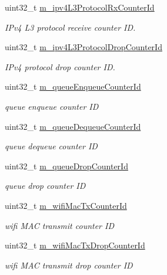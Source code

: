 \begin{DoxyCompactItemize}
uint32\+\_\+t \hyperlink{classns3_1_1AnimationInterface_a625621f7209fc0e635a2850ce24133c8}{m\+\_\+ipv4\+L3\+Protocol\+Rx\+Counter\+Id}
\begin{DoxyCompactList}\small\item\em I\+Pv4 L3 protocol receive counter ID. \end{DoxyCompactList}\item 
uint32\+\_\+t \hyperlink{classns3_1_1AnimationInterface_ae5e090091bd3389039c7235259a9cfd5}{m\+\_\+ipv4\+L3\+Protocol\+Drop\+Counter\+Id}
\begin{DoxyCompactList}\small\item\em I\+Pv4 protocol drop counter ID. \end{DoxyCompactList}\item 
uint32\+\_\+t \hyperlink{classns3_1_1AnimationInterface_a794c549292d2c3e2d272e70d1c7ed237}{m\+\_\+queue\+Enqueue\+Counter\+Id}
\begin{DoxyCompactList}\small\item\em queue enqueue counter ID \end{DoxyCompactList}\item 
uint32\+\_\+t \hyperlink{classns3_1_1AnimationInterface_a768ca45226f8c1b690c029f76c86fdaa}{m\+\_\+queue\+Dequeue\+Counter\+Id}
\begin{DoxyCompactList}\small\item\em queue dequeue counter ID \end{DoxyCompactList}\item 
uint32\+\_\+t \hyperlink{classns3_1_1AnimationInterface_a0f96f618c8aae5a68b84efc5ac31f6f6}{m\+\_\+queue\+Drop\+Counter\+Id}
\begin{DoxyCompactList}\small\item\em queue drop counter ID \end{DoxyCompactList}\item 
uint32\+\_\+t \hyperlink{classns3_1_1AnimationInterface_a839ac18c36b5fa23aba8062c20048594}{m\+\_\+wifi\+Mac\+Tx\+Counter\+Id}
\begin{DoxyCompactList}\small\item\em wifi M\+AC transmit counter ID \end{DoxyCompactList}\item 
uint32\+\_\+t \hyperlink{classns3_1_1AnimationInterface_aa4543b178ed88dc98eb8976eaccca092}{m\+\_\+wifi\+Mac\+Tx\+Drop\+Counter\+Id}
\begin{DoxyCompactList}\small\item\em wifi M\+AC transmit drop counter ID \end{DoxyCompactList}\item 

\end{DoxyCompactItemize}
